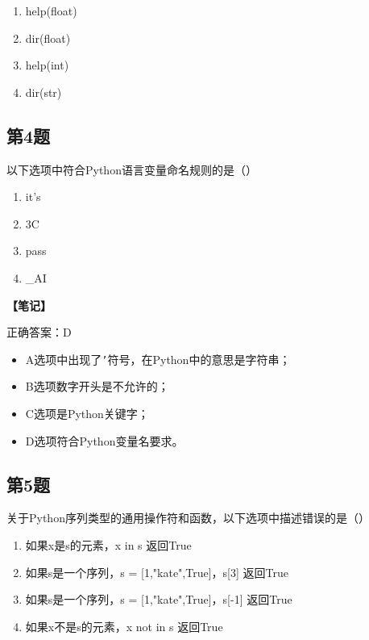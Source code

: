 \begin{enumerate}[label=\Alph*.]
  \item help(float)
  \item dir(float)
  \item help(int)
  \item dir(str)
\end{enumerate}

\subsection{第4题}
以下选项中符合Python语言变量命名规则的是（）

\begin{enumerate}[label=\Alph*.]
  \item it's
  \item 3C
  \item pass
  \item \_AI
\end{enumerate}

\begin{mdframed}[linewidth=1pt, linecolor=black]

  \textbf{\color{red}【笔记】}

  正确答案：D

  \begin{itemize}
    \item A选项中出现了\texttt{'}符号，在Python中的意思是字符串；
    \item B选项数字开头是不允许的；
    \item C选项是Python关键字；
    \item D选项符合Python变量名要求。
  \end{itemize}

\end{mdframed}

\subsection{第5题}
关于Python序列类型的通用操作符和函数，以下选项中描述错误的是（）

\begin{enumerate}[label=\Alph*.]
  \item 如果x是s的元素，x in s 返回True
  \item 如果s是一个序列，s = [1,"kate",True]，s[3] 返回True
  \item 如果s是一个序列，s = [1,"kate",True]，s[-1] 返回True
  \item 如果x不是s的元素，x not in s 返回True
\end{enumerate}

